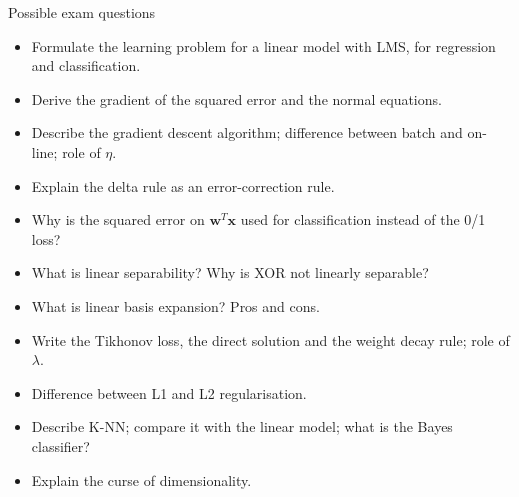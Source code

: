 \begin{boxquestion}{Possible exam questions}

\begin{itemize}
\tightlist
\item
  Formulate the learning problem for a linear model with LMS, for
  regression and classification.
\item
  Derive the gradient of the squared error and the normal equations.
\item
  Describe the gradient descent algorithm; difference between batch
  and on-line; role of \(\eta\).
\item
  Explain the delta rule as an error-correction rule.
\item
  Why is the squared error on \(\mathbf{w}^T\mathbf{x}\) used for
  classification instead of the 0/1 loss?
\item
  What is linear separability? Why is XOR not linearly separable?
\item
  What is linear basis expansion? Pros and cons.
\item
  Write the Tikhonov loss, the direct solution and the weight decay
  rule; role of \(\lambda\).
\item
  Difference between L1 and L2 regularisation.
\item
  Describe K-NN; compare it with the linear model; what is the Bayes
  classifier?
\item
  Explain the curse of dimensionality.
\end{itemize}

\end{boxquestion}
